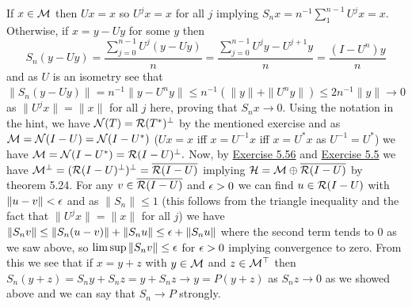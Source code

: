 \documentclass[12pt,a4paper]{article}
\begin{document}
\begin{solution}
    If $x\in\mathcal{M}$ then $Ux=x$ so $U^jx=x$ for all $j$ implying $S_nx=n^{-1}\sum_1^{n-1}U^jx=x$. 
    Otherwise, if $x=y-Uy$ for some $y$ then 
    \[
        S_n(y-Uy)= \frac{\sum_{j=0}^{n-1}U^j(y-Uy)}{n}= \frac{\sum_{j=0}^{n-1}U^jy-U^{j+1}y}{n}= \frac{(I-U^n)y}{n}
    \]
    and as $U$ is an isometry see that $\|S_n(y-Uy)\|=n^{-1}\|y-U^ny\|\leq n^{-1}(\|y\|+\|U^ny\|)\leq2n^{-1}\|y\|\to 0$ as $\|U^jx\|=\|x\|$ for all $j$ here, proving that $S_nx\to 0.$ 
    Using the notation in the hint, we have $\mathcal{N}(T)=\mathcal{R}(T^*)^\perp$ by the mentioned exercise and as $\mathcal{M}=\mathcal{N}(I-U)=\mathcal{N}(I-U^*)$ ($Ux=x$ iff $x=U^{-1}x$ iff $x=U^*x$ as $U^{-1}=U^*$) we have $\mathcal{M}=\mathcal{N}(I-U^*)=\mathcal{R}(I-U)^\perp.$  
    Now, by \hyperref[prob:5-56]{Exercise 5.56} and \hyperref[prob:5-5]{Exercise 5.5} we have $\mathcal{M}^\perp=(\mathcal{R}(I-U)^\perp)^\perp= \overline{\mathcal{R}(I-U)}$ implying $\mathcal{H}=\mathcal{M}\oplus \overline{\mathcal{R}(I-U)}$ by theorem 5.24.  
    For any $v\in \overline{\mathcal{R}(I-U)}$ and $\epsilon>0$ we can find $u\in\mathcal{R}(I-U)$ with $\|u-v\|<\epsilon$ and as $\|S_n\|\leq 1$ (this follows from the triangle inequality and the fact that $\|U^jx\|=\|x\|$ for all $j$) we have $\|S_nv\|\leq\|S_n(u-v)\|+\|S_nu\|\leq\epsilon+\|S_nu\|$ where the second term tends to $0$ as we saw above, so $\limsup\|S_nv\|\leq\epsilon$ for $\epsilon>0$ implying convergence to zero. 
    From this we see that if $x=y+z$ with $y\in\mathcal{M}$ and $z\in\mathcal{M}^\top$ then $S_n(y+z)=S_ny+S_nz=y+S_nz\to y=P(y+z)$ as $S_nz\to 0$ as we showed above and we can say that $S_n\to P$ strongly. 
\end{solution}
\end{document}
